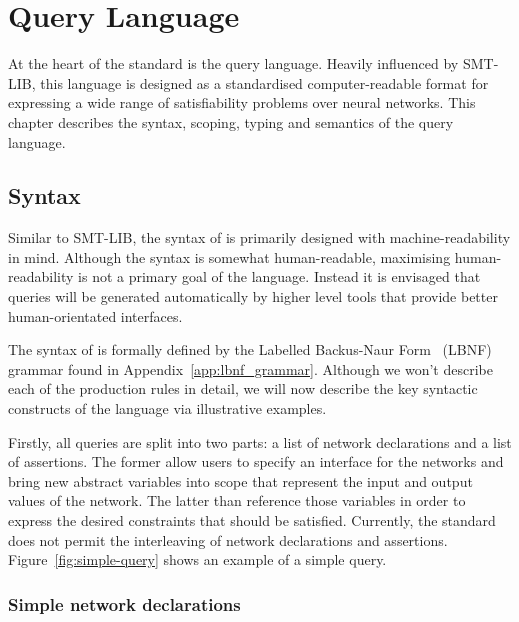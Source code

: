 \chapter{Query Language}\label{sec:specification_language}

At the heart of the \vnnlib{} standard is the \vnnlib{} query language. Heavily influenced by SMT-LIB, this language is designed as a standardised computer-readable format for expressing a wide range of satisfiability problems over neural networks. This chapter describes the syntax, scoping, typing and semantics of the query language.

\section{Syntax}
\label{sec:syntax}


Similar to SMT-LIB, the syntax of \vnnlib{} is primarily designed with machine-readability in mind. Although the syntax is somewhat human-readable, maximising human-readability is not a primary goal of the language. Instead it is envisaged that \vnnlib{} queries will be generated automatically by higher level tools that provide better human-orientated interfaces.

The syntax of \vnnlib{} is formally defined by the Labelled Backus-Naur Form~\cite{forsberg2005labelled} (LBNF) grammar found in Appendix~\ref{app:lbnf_grammar}. Although we won't describe each of the production rules in detail, we will now describe the key syntactic constructs of the language via illustrative examples.

Firstly, all \vnnlib{} queries are split into two parts: a list of network declarations and a list of assertions. The former allow users to specify an interface for the networks and bring new abstract variables into scope that represent the input and output values of the network. The latter than reference those variables in order to express the desired constraints that should be satisfied. Currently, the standard does not permit the interleaving of network declarations and assertions. Figure~\ref{fig:simple-query} shows an example of a simple query.

\subsection{Simple network declarations}
\label{sec:network-declarations}

